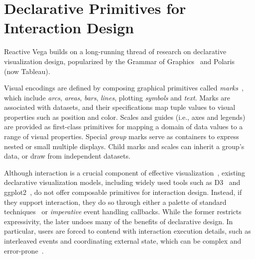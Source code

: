 \graphicspath{{./vega-lang/figures/}}
\chapter{Declarative Primitives for Interaction Design}
\label{sec:vg:lang}

Reactive Vega builds on a long-running thread of research on declarative
visualization design, popularized by the Grammar of
Graphics~\cite{wilkinson:grammar} and Polaris~\cite{stolte:polaris} (now
Tableau).

Visual encodings are defined by composing graphical primitives called
\emph{marks}~\cite{bostock:protovis}, which include \emph{arcs}, \emph{areas},
\emph{bars}, \emph{lines}, plotting \emph{symbols} and \emph{text}. Marks are
associated with datasets, and their specifications map tuple values to visual
properties such as position and color. Scales and guides (i.e., axes and
legends) are provided as first-class primitives for mapping a domain of data
values to a range of visual properties. Special \emph{group} marks serve as
containers to express nested or small multiple displays. Child marks and scales
can inherit a group's data, or draw from independent datasets.

Although interaction is a crucial component of effective
visualization~\cite{liu:mentalmodels, pike:interactionscience}, existing
declarative visualization models, including widely used tools such as
D3~\cite{bostock:d3} and ggplot2~\cite{wickham:ggplot2}, do not offer composable
primitives for interaction design. Instead, if they support interaction, they do
so through either a palette of standard techniques~\cite{bostock:protovis,
bostock:d3} or \emph{imperative} event handling callbacks. While the former
restricts expressivity, the later undoes many of the benefits of declarative
design. In particular, users are forced to contend with interaction execution
details, such as interleaved events and coordinating external state, which can
be complex and error\--prone~\cite{cooper:embedding, edwards:coherent,
myers:callbacks}.

